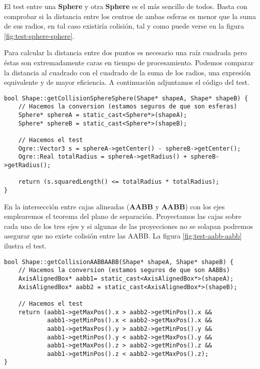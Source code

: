
El test entre una \textbf{Sphere} y otra \textbf{Sphere} es el más sencillo
de todos. Basta con comprobar si la distancia entre los centros de ambas
esferas es menor que la suma de sus radios, en tal caso existiría colisión,
tal y como puede verse en la figura \ref{fig:test-sphere-sphere}.\\


Para calcular la distancia entre dos puntos es necesario una raíz cuadrada
pero éstas son extremadamente caras en tiempo de procesamiento. Podemos
comparar la distancia al cuadrado con el cuadrado de la suma de los radios,
una expresión equivalente y de mayor eficiencia. A continuación adjuntamos
el código del test.

\begin{lstlisting}[style=C++]
bool Shape::getCollisionSphereSphere(Shape* shapeA, Shape* shapeB) {
    // Hacemos la conversion (estamos seguros de que son esferas)
    Sphere* sphereA = static_cast<Sphere*>(shapeA);
    Sphere* sphereB = static_cast<Sphere*>(shapeB);

    // Hacemos el test
    Ogre::Vector3 s = sphereA->getCenter() - sphereB->getCenter();
    Ogre::Real totalRadius = sphereA->getRadius() + sphereB->getRadius();

    return (s.squaredLength() <= totalRadius * totalRadius);
}
\end{lstlisting}

En la intersección entre cajas alineadas (\textbf{AABB} y \textbf{AABB})
con los ejes emplearemos el teorema del plano de separación. Proyectamos
las cajas sobre cada uno de los tres ejes y si algunas de las proyecciones
no se solapan podremos asegurar que no existe colisión entre las AABB.
La figura \ref{fig:test-aabb-aabb} ilustra el test.\\


\begin{lstlisting}[style=C++]
bool Shape::getCollisionAABBAABB(Shape* shapeA, Shape* shapeB) {
    // Hacemos la conversion (estamos seguros de que son AABBs)
    AxisAlignedBox* aabb1= static_cast<AxisAlignedBox*>(shapeA);
    AxisAlignedBox* aabb2 = static_cast<AxisAlignedBox*>(shapeB);

    // Hacemos el test
    return (aabb1->getMaxPos().x > aabb2->getMinPos().x &&
            aabb1->getMinPos().x < aabb2->getMaxPos().x &&
            aabb1->getMaxPos().y > aabb2->getMinPos().y &&
            aabb1->getMinPos().y < aabb2->getMaxPos().y &&
            aabb1->getMaxPos().z > aabb2->getMinPos().z &&
            aabb1->getMinPos().z < aabb2->getMaxPos().z);
}
\end{lstlisting}

